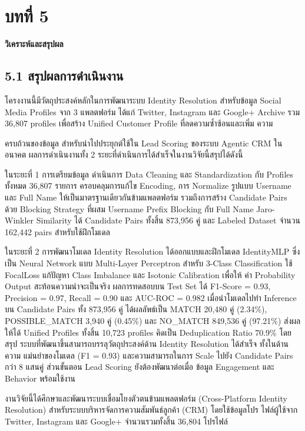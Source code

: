 \documentclass[12pt,a4paper]{report}
\begin{document}
\chapter*{บทที่ 5}
\begin{center}\Large\bfseries วิเคราะห์และสรุปผล\end{center}
\section*{5.1 สรุปผลการดำเนินงาน}
โครงงานนี้มีวัตถุประสงค์หลักในการพัฒนาระบบ Identity Resolution สำหรับข้อมูล Social Media Profiles จาก 3 แพลตฟอร์ม ได้แก่ Twitter, Instagram และ Google+ Archive รวม 36,807 profiles เพื่อสร้าง Unified Customer Profile ที่ลดความซ้ำซ้อนและเพิ่ม ความ\par
\clearpage
ครบถ้วนของข้อมูล สำหรับนำไปประยุกต์ใช้ใน Lead Scoring ของระบบ Agentic CRM ใน อนาคต ผลการดำเนินงานทั้ง 2 ระยะที่ดำเนินการได้สำเร็จในงานวิจัยนี้สรุปได้ดังนี้\par
ในระยะที่ 1 การเตรียมข้อมูล ดำเนินการ Data Cleaning และ Standardization กับ Profiles ทั้งหมด 36,807 รายการ ครอบคลุมการแก้ไข Encoding, การ Normalize รูปแบบ Username และ Full Name ให้เป็นมาตรฐานเดียวกันข้ามแพลตฟอร์ม รวมถึงการสร้าง Candidate Pairs ด้วย Blocking Strategy ที่ผสม Username Prefix Blocking กับ Full Name Jaro-Winkler Similarity ได้ Candidate Pairs ทั้งสิ้น 873,956 คู่ และ Labeled Dataset จำนวน 162,442 pairs สำหรับใช้ฝึกโมเดล\par
ในระยะที่ 2 การพัฒนาโมเดล Identity Resolution ได้ออกแบบและฝึกโมเดล IdentityMLP ซึ่งเป็น Neural Network แบบ Multi-Layer Perceptron สำหรับ 3-Class Classification ใช้ FocalLoss แก้ปัญหา Class Imbalance และ Isotonic Calibration เพื่อให้ ค่า Probability Output สะท้อนความน่าจะเป็นจริง ผลการทดสอบบน Test Set ได้ F1-Score = 0.93, Precision = 0.97, Recall = 0.90 และ AUC-ROC = 0.982 เมื่อนำโมเดลไปทำ Inference บน Candidate Pairs ทั้ง 873,956 คู่ ได้ผลลัพธ์เป็น MATCH 20,480 คู่ (2.34\%), POSSIBLE\_MATCH 3,940 คู่ (0.45\%) และ NO\_MATCH 849,536 คู่ (97.21\%) ส่งผลให้ได้ Unified Profiles ทั้งสิ้น 10,723 profiles คิดเป็น Deduplication Ratio 70.9\% โดยสรุป ระบบที่พัฒนาขึ้นสามารถบรรลุวัตถุประสงค์ด้าน Identity Resolution ได้สำเร็จ ทั้งในด้านความ แม่นยำของโมเดล (F1 = 0.93) และความสามารถในการ Scale ไปยัง Candidate Pairs กว่า 8 แสนคู่ ส่วนขั้นตอน Lead Scoring ยังต้องพัฒนาต่อเมื่อ ข้อมูล Engagement และ Behavior พร้อมใช้งาน\par
งานวิจัยนี้ได้ศึกษาและพัฒนาระบบเชื่อมโยงตัวตนข้ามแพลตฟอร์ม (Cross-Platform Identity Resolution) สำหรับระบบบริหารจัดการความสัมพันธ์ลูกค้า (CRM) โดยใช้ข้อมูลโปร ไฟล์ผู้ใช้จาก Twitter, Instagram และ Google+ จำนวนรวมทั้งสิ้น 36,804 โปรไฟล์\par
\end{document}
